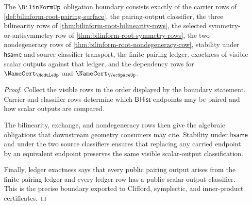 \begin{theorem}
\label{thm:bilinform-root-ledger-exactness-boundary}
The $\BilinFormUp$ obligation boundary consists exactly of the carrier rows of \autoref{def:bilinform-root-pairing-surface}, the pairing-output classifier, the three bilinearity rows of \autoref{thm:bilinform-root-bilinearity-rows}, the selected symmetry-or-antisymmetry row of \autoref{thm:bilinform-root-symmetry-rows}, the two nondegeneracy rows of \autoref{thm:bilinform-root-nondegeneracy-row}, stability under $\mathsf{hsame}$ and source-classifier transport, the finite pairing ledger, exactness of visible scalar outputs against that ledger, and the dependency rows for $\NameCert_{\ModuleUp}$ and $\NameCert_{\VecSpaceUp}$.
\end{theorem}
\begin{proof}
Collect the visible rows in the order displayed by the boundary statement. Carrier and classifier rows determine which $\mathsf{BHist}$ endpoints may be paired and how scalar outputs are compared.

The bilinearity, exchange, and nondegeneracy rows then give the algebraic obligations that downstream geometry consumers may cite. Stability under $\mathsf{hsame}$ and under the two source classifiers ensures that replacing any carried endpoint by an equivalent endpoint preserves the same visible scalar-output classification.

Finally, ledger exactness says that every public pairing output arises from the finite pairing ledger and every ledger row has a public scalar-output classifier. This is the precise boundary exported to Clifford, symplectic, and inner-product certificates.
\end{proof}

